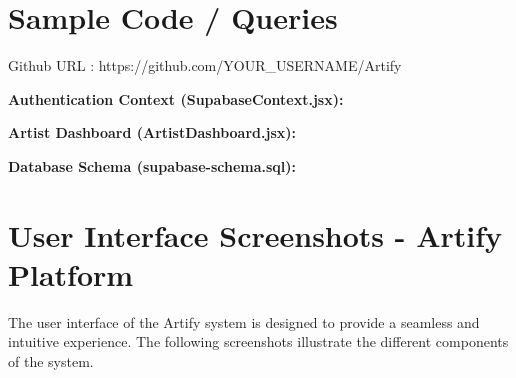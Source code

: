 \documentclass[12pt,a4paper]{report}
\begin{document}
\clearpage

\setcounter{chapter}{8}
\setcounter{section}{0}
\clearpage
\thispagestyle{empty}

\noindent
{}

\clearpage
{}

\pagestyle{maincontent}

\section{Sample Code / Queries}

Github URL : https://github.com/YOUR_USERNAME/Artify

\textbf{Authentication Context (SupabaseContext.jsx):}


\vspace{0.5cm}

\textbf{Artist Dashboard (ArtistDashboard.jsx):}


\vspace{0.5cm}

\textbf{Database Schema (supabase-schema.sql):}


\vspace{0.5cm}

\newpage
\section{User Interface Screenshots - Artify Platform}

The user interface of the Artify system is designed to provide a seamless and intuitive experience. 
The following screenshots illustrate the different components of the system.\\

\end{document}
